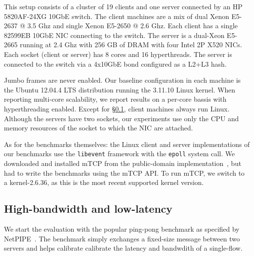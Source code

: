  This setup consists of a cluster of 19
clients and one server connected by an HP 5820AF-24XG 10GbE switch.
The client machines are a mix of dual Xenon E5-2637 @ 3.5 Ghz
and single Xenon E5-2650 @ 2.6 Ghz.  Each client has a single
82599EB 10GbE NIC connecting to the switch.  The server is a dual-Xeon
E5-2665 running at 2.4 Ghz with 256 GB of DRAM with four Intel 2P X520
NICs.  Each socket (client or server) has 8 cores and 16 hyperthreads.
The server is connected to the switch via a 4x10GbE bond configured as a L2+L3 hash.

 Jumbo frames are never enabled.  Our
baseline configuration in each machine is the Ubuntu 12.04.4 LTS
distribution running the 3.11.10 Linux kernel.  When reporting
multi-core scalability, we report results on a per-core bassis with
hyperthreading enabled.  Except for \S\ref{sec:eval:netpipe}, client
machines always run Linux. Although the servers have two sockets, our
experiments use only the CPU and memory resources of the socket to
which the NIC are attached.



%




As for the benchmarks themselves: the Linux client and server
implementations of our benchmarks use the \texttt{libevent} framework
with the \texttt{epoll} system call.  We downloaded and installed mTCP
from the public-domain implementation~\cite{url:mtcp}, but had to
write the benchmarks using the mTCP API.  To run mTCP, we switch to a
kernel-2.6.36, as this is the most recent supported kernel version.

\subsection{High-bandwidth and low-latency}
\label{sec:eval:netpipe}


We start the evaluation with the popular ping-pong benchmark as
specified by NetPIPE~\cite{snell1996netpipe}. The benchmark simply
exchanges a fixed-size message between two servers and helps calibrate
calibrate the latency and bandwdith of a single-flow.

